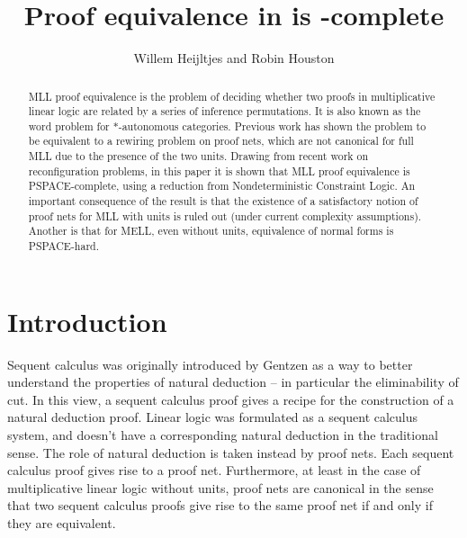 \documentclass{lmcs}
\title{Proof equivalence in \capsabbrev{mll} is \capsabbrev{pspace}-complete}
\author{Willem Heijltjes and Robin Houston}
\let\capsabbrev=\uppercase
\begin{document}




\begin{abstract}
\capsabbrev{mll} proof equivalence is the problem of deciding whether two proofs in multiplicative linear logic are related by a series of inference permutations.
%
It is also known as the word problem for $*$-autonomous categories.
%
Previous work has shown the problem to be equivalent to a rewiring problem on proof nets, which are not canonical for full \capsabbrev{mll} due to the presence of the two units.
%
Drawing from recent work on reconfiguration problems, in this paper it is shown that \capsabbrev{mll} proof equivalence is \capsabbrev{pspace}-complete, using a reduction from Nondeterministic Constraint Logic.
%
An important consequence of the result is that the existence of a satisfactory notion of proof nets for \capsabbrev{mll} with units is ruled out (under current complexity assumptions).
%
Another is that for \capsabbrev{mell}, even without units, equivalence of normal forms is \capsabbrev{pspace}-hard.
\end{abstract}


\maketitle



\section{Introduction}
\noindent
Sequent calculus was originally introduced by Gentzen as a way to better understand
the properties of natural deduction -- in particular the eliminability of cut. In this
view, a sequent calculus proof gives a recipe for the construction of a natural deduction
proof.
%
Linear logic was formulated as a sequent calculus system, and doesn't have a corresponding
natural deduction in the %
traditional sense. The role of natural deduction is taken instead by
proof nets. Each sequent calculus proof gives rise to a proof net. Furthermore, at least in
the case of multiplicative linear logic without units, proof nets are canonical in the sense
that two sequent calculus proofs give rise to the same proof net if and only if they are
equivalent.
\end{document}
